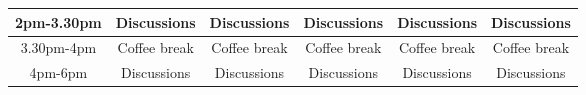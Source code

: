 \documentclass{beamer}
\begin{document}
\begin{frame}
\begin{block}{}
{\begin{tabular}{cccccc}
\hline
2pm-3.30pm     & Discussions                                             & Discussions                           & Discussions                                                                        & Discussions                                                              & Discussions                                                                \\
\hline
3.30pm-4pm     & Coffee break                                            & Coffee break                          & Coffee break                                                                       & Coffee break                                                             & Coffee break                                                               \\
4pm-6pm        & Discussions                                             & Discussions                           & Discussions                                                                        & Discussions                                                              & Discussions                                                                \\
\hline
\end{tabular}
}

\noindent
\end{block}
\end{frame}
\end{document}

